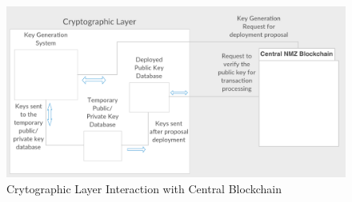\documentclass[a4paper,twoside,phd]{BYUPhys}
\begin{document}
\begin{figure}
  \includegraphics[width=\linewidth]{cryptographic_layer.png}
  \caption{Crytographic Layer Interaction with Central Blockchain}
  \label{fig:6}
\end{figure}
\end{document}
